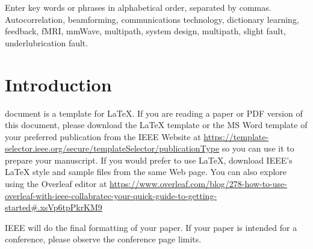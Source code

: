 \documentclass{ieeeaccess}
\begin{document}
\begin{keywords}
Enter key words or phrases in alphabetical
order, separated by commas. Autocorrelation, beamforming, communications technology, dictionary learning, feedback, fMRI, mmWave, multipath, system design, multipath, slight fault, underlubrication fault.
\end{keywords}

\titlepgskip=-21pt

\maketitle

\section{Introduction}
\label{sec:introduction}
 document is a template for \LaTeX. If you are reading a paper or PDF version of this document, please download the LaTeX template or the MS Word
template of your preferred publication from the IEEE Website at \underline
{https://template-selector.ieee.org/secure/templateSelec}\break\underline{tor/publicationType} so you can use it to prepare your manuscript. 
If you would prefer to use LaTeX, download IEEE's LaTeX style and sample files
from the same Web page. You can also explore using the Overleaf editor at
\underline
{https://www.overleaf.com/blog/278-how-to-use-overleaf-}\break\underline{with-ieee-collabratec-your-quick-guide-to-getting-started}\break\underline{\#.xsVp6tpPkrKM9}

IEEE will do the final formatting of your paper. If your paper is intended
for a conference, please observe the conference page limits.

\EOD
\end{document}
